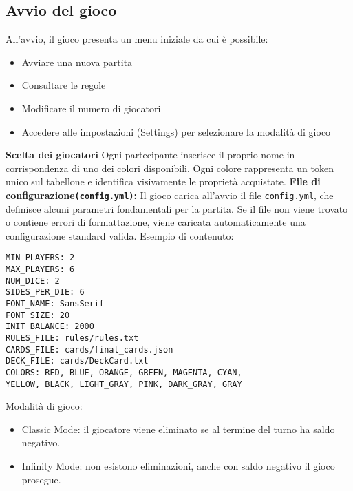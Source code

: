 \subsection{Avvio del gioco}
All’avvio, il gioco presenta un menu iniziale da cui è possibile:\newline
\begin{itemize}
    \item Avviare una nuova partita
    \item Consultare le regole
    \item Modificare il numero di giocatori
    \item Accedere alle impostazioni (Settings) per selezionare la modalità di gioco
\end{itemize}
\textbf{Scelta dei giocatori}\newline
Ogni partecipante inserisce il proprio nome in corrispondenza di uno dei colori disponibili. Ogni colore rappresenta un token unico sul tabellone e identifica visivamente le proprietà acquistate.\newline
\textbf{File di configurazione\texttt{(config.yml)}:}\newline
Il gioco carica all’avvio il file \texttt{config.yml}, che definisce alcuni parametri fondamentali per la partita. Se il file non viene trovato o contiene errori di formattazione, viene caricata automaticamente una configurazione standard valida.\newline
Esempio di contenuto:\newline
\begin{verbatim}
MIN_PLAYERS: 2
MAX_PLAYERS: 6
NUM_DICE: 2
SIDES_PER_DIE: 6
FONT_NAME: SansSerif
FONT_SIZE: 20
INIT_BALANCE: 2000
RULES_FILE: rules/rules.txt
CARDS_FILE: cards/final_cards.json
DECK_FILE: cards/DeckCard.txt
COLORS: RED, BLUE, ORANGE, GREEN, MAGENTA, CYAN, 
YELLOW, BLACK, LIGHT_GRAY, PINK, DARK_GRAY, GRAY
\end{verbatim}
Modalità di gioco:\newline
\begin{itemize}
    \item Classic Mode: il giocatore viene eliminato se al termine del turno ha saldo negativo.
    \item Infinity Mode: non esistono eliminazioni, anche con saldo negativo il gioco prosegue.
\end{itemize}
